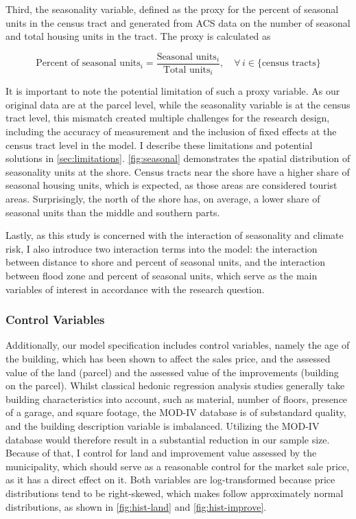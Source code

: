 \documentclass[11pt]{article}
\begin{document}
        Third, the seasonality variable, defined as the proxy for the percent of seasonal units in the census tract and generated from ACS data on the number of seasonal and total housing units in the tract. The proxy is calculated as 

        \begin{equation}
        \text{Percent of seasonal units}_{i} = \frac{\text{Seasonal units}_{i}}{\text{Total units}_{i}}, \quad \forall\, i \in \{\text{census tracts}\}
        \end{equation}

        It is important to note the potential limitation of such a proxy variable. As our original data are at the parcel level, while the seasonality variable is at the census tract level, this mismatch created multiple challenges for the research design, including the accuracy of measurement and the inclusion of fixed effects at the census tract level in the model. I describe these limitations and potential solutions in \autoref{sec:limitations}. \autoref{fig:seasonal} demonstrates the spatial distribution of seasonality units at the shore. Census tracts near the shore have a higher share of seasonal housing units, which is expected, as those areas are considered tourist areas. Surprisingly, the north of the shore has, on average, a lower share of seasonal units than the middle and southern parts. 

        Lastly, as this study is concerned with the interaction of seasonality and climate risk, I also introduce two interaction terms into the model: the interaction between distance to shore and percent of seasonal units, and the interaction between flood zone and percent of seasonal units, which serve as the main variables of interest in accordance with the research question. 
        
        \subsubsection{Control Variables}

        Additionally, our model specification includes control variables, namely the age of the building, which has been shown to affect the sales price, and the assessed value of the land (parcel) and the assessed value of the improvements (building on the parcel). Whilst classical hedonic regression analysis studies generally take building characteristics into account, such as material, number of floors, presence of a garage, and square footage, the MOD-IV database is of substandard quality, and the building description variable is imbalanced. Utilizing the MOD-IV database would therefore result in a substantial reduction in our sample size. Because of that, I control for land and improvement value assessed by the municipality, which should serve as a reasonable control for the market sale price, as it has a direct effect on it. Both variables are log-transformed because price distributions tend to be right-skewed, which makes follow approximately normal distributions, as shown in \autoref{fig:hist-land} and \autoref{fig:hist-improve}. 
\end{document}
